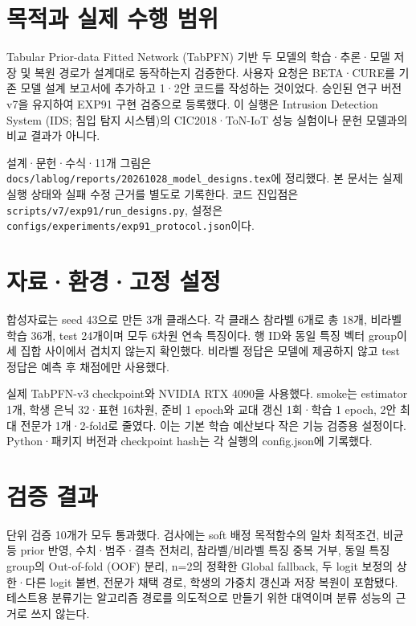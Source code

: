 

\section{목적과 실제 수행 범위}
Tabular Prior-data Fitted Network (TabPFN) 기반 두 모델의 학습·추론·모델 저장 및 복원 경로가 설계대로 동작하는지 검증한다. 사용자 요청은 BETA·CURE를 기존 모델 설계 보고서에 추가하고 1·2안 코드를 작성하는 것이었다. 승인된 연구 버전 v7을 유지하여 EXP91 구현 검증으로 등록했다. 이 실행은 Intrusion Detection System (IDS; 침입 탐지 시스템)의 CIC2018·ToN-IoT 성능 실험이나 문헌 모델과의 비교 결과가 아니다.

설계·문헌·수식·11개 그림은 \texttt{docs/\allowbreak{}\allowbreak{}lab\allowbreak{}log/\allowbreak{}\allowbreak{}repo\allowbreak{}rts/\allowbreak{}\allowbreak{}2026\allowbreak{}1028\_\allowbreak{}\allowbreak{}mod\allowbreak{}el\_\allowbreak{}\allowbreak{}desig\allowbreak{}ns.\allowbreak{}tex}에 정리했다. 본 문서는 실제 실행 상태와 실패 수정 근거를 별도로 기록한다. 코드 진입점은 \texttt{scripts/\allowbreak{}\allowbreak{}v7/\allowbreak{}\allowbreak{}exp91\allowbreak{}/\allowbreak{}\allowbreak{}run\_\allowbreak{}\allowbreak{}des\allowbreak{}igns.\allowbreak{}py}, 설정은 \texttt{configs/\allowbreak{}\allowbreak{}experime\allowbreak{}nts/\allowbreak{}\allowbreak{}exp9\allowbreak{}1\_\allowbreak{}\allowbreak{}protoc\allowbreak{}ol.\allowbreak{}json}이다.

\section{자료·환경·고정 설정}
합성자료는 seed 43으로 만든 3개 클래스다. 각 클래스 참라벨 6개로 총 18개, 비라벨 학습 36개, test 24개이며 모두 6차원 연속 특징이다. 행 ID와 동일 특징 벡터 group이 세 집합 사이에서 겹치지 않는지 확인했다. 비라벨 정답은 모델에 제공하지 않고 test 정답은 예측 후 채점에만 사용했다.

실제 TabPFN-v3 checkpoint와 NVIDIA RTX 4090을 사용했다. smoke는 estimator 1개, 학생 은닉 32·표현 16차원, 준비 1 epoch와 교대 갱신 1회·학습 1 epoch, 2안 최대 전문가 1개·2-fold로 줄였다. 이는 기본 학습 예산보다 작은 기능 검증용 설정이다. Python·패키지 버전과 checkpoint hash는 각 실행의 config.json에 기록했다.

\section{검증 결과}
단위 검증 10개가 모두 통과했다. 검사에는 soft 배정 목적함수의 일차 최적조건, 비균등 prior 반영, 수치·범주·결측 전처리, 참라벨/\allowbreak{}비라벨 특징 중복 거부, 동일 특징 group의 Out-of-fold (OOF) 분리, n=\allowbreak{}2의 정확한 Global fallback, 두 logit 보정의 상한·다른 logit 불변, 전문가 채택 경로, 학생의 가중치 갱신과 저장 복원이 포함됐다. 테스트용 분류기는 알고리즘 경로를 의도적으로 만들기 위한 대역이며 분류 성능의 근거로 쓰지 않는다.

